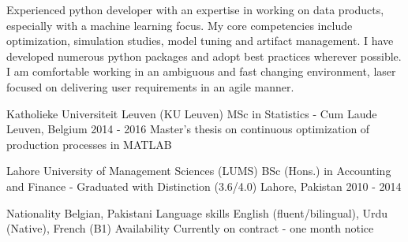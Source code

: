 \begin{cvparagraph}

\vspace{1mm}

Experienced python developer with an expertise in working on data products, especially with a machine learning focus. My core competencies include optimization, simulation studies, model tuning and artifact management. I have developed numerous python packages and adopt best practices wherever possible. I am comfortable working in an ambiguous and fast changing environment, laser focused on delivering user requirements in an agile manner.
\end{cvparagraph}

\vspace{2mm}
\begin{cventries}
  \cventry
    {Katholieke Universiteit Leuven (KU Leuven)} %
    {MSc in Statistics - Cum Laude} %
    {Leuven, Belgium} %
    {2014 - 2016} %
    {Master's thesis on continuous optimization of production processes in MATLAB}

  \cventry
    {Lahore University of Management Sciences (LUMS)} %
    {BSc (Hons.) in Accounting and Finance - Graduated with Distinction (3.6/4.0)} %
    {Lahore, Pakistan} %
    {2010 - 2014} %
    {}
\end{cventries}

\vspace{-5mm}

\vspace{2mm}

\begin{cvskills}
    \cvskill
    {Nationality} %
    {Belgian, Pakistani}
    \cvskill
    {Language skills}
    {English (fluent/bilingual), Urdu (Native), French (B1)}
    \cvskill
    {Availability}
    {Currently on contract - one month notice}
\end{cvskills}

